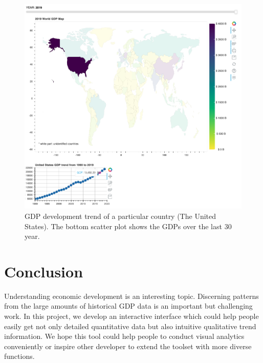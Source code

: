 \documentclass{vgtc}                          %
\begin{document}
\begin{figure}[tb]
  \centering
  \includegraphics[width=\columnwidth]{gdp_fig6.png}
  \caption{GDP development trend of a particular country (The United States). The bottom scatter plot shows the GDPs over the last 30 year.}
  \label{fig:5}
\end{figure}

\section{Conclusion}
Understanding economic development is an interesting topic. Discerning patterns from the large amounts of historical GDP data is an important but challenging work. In this project, we develop an interactive interface which could help people easily get not only detailed quantitative data but also intuitive qualitative trend information. We hope this tool could help people to conduct visual analytics conveniently or inspire other developer to extend the toolset with more diverse functions. 




\end{document}
